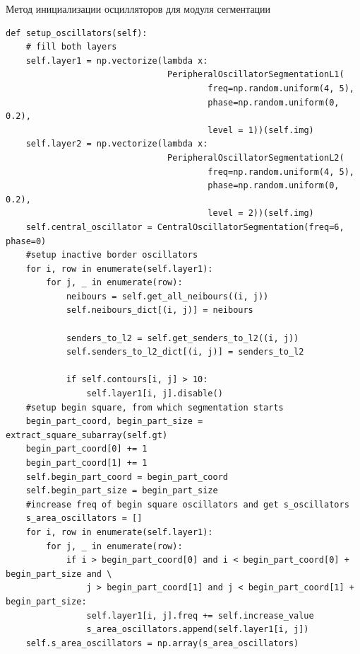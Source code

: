 \documentclass[14pt, russian]{scrartcl}
\begin{document}
\begin{listing}[H]
    \caption{Метод инициализации осцилляторов для модуля сегментации}
    \label{lst:contour_extr_sobel}
    \begin{verbatim}
def setup_oscillators(self):
    # fill both layers
    self.layer1 = np.vectorize(lambda x: 
                                PeripheralOscillatorSegmentationL1(
                                        freq=np.random.uniform(4, 5),
                                        phase=np.random.uniform(0, 0.2),
                                        level = 1))(self.img)
    self.layer2 = np.vectorize(lambda x: 
                                PeripheralOscillatorSegmentationL2(
                                        freq=np.random.uniform(4, 5),
                                        phase=np.random.uniform(0, 0.2),
                                        level = 2))(self.img)
    self.central_oscillator = CentralOscillatorSegmentation(freq=6, phase=0)
    #setup inactive border oscillators
    for i, row in enumerate(self.layer1):
        for j, _ in enumerate(row):
            neibours = self.get_all_neibours((i, j))
            self.neibours_dict[(i, j)] = neibours

            senders_to_l2 = self.get_senders_to_l2((i, j))
            self.senders_to_l2_dict[(i, j)] = senders_to_l2

            if self.contours[i, j] > 10:
                self.layer1[i, j].disable()
    #setup begin square, from which segmentation starts
    begin_part_coord, begin_part_size = extract_square_subarray(self.gt)
    begin_part_coord[0] += 1
    begin_part_coord[1] += 1
    self.begin_part_coord = begin_part_coord
    self.begin_part_size = begin_part_size
    #increase freq of begin square oscillators and get s_oscillators
    s_area_oscillators = []
    for i, row in enumerate(self.layer1):
        for j, _ in enumerate(row):
            if i > begin_part_coord[0] and i < begin_part_coord[0] + begin_part_size and \
                j > begin_part_coord[1] and j < begin_part_coord[1] + begin_part_size:
                self.layer1[i, j].freq += self.increase_value
                s_area_oscillators.append(self.layer1[i, j])
    self.s_area_oscillators = np.array(s_area_oscillators)
    \end{verbatim}
\end{listing}
\end{document}
